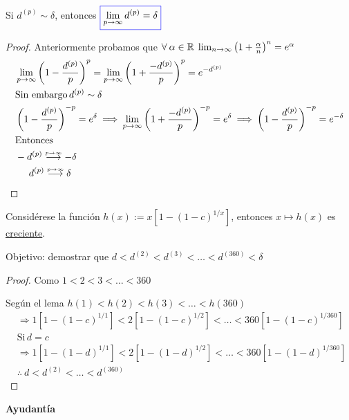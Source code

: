 \begin{proposition}
Si $d^{(p)} \sim \delta$, entonces $\color{blue}\boxed{\color{black} \lim_{p \to \infty} d^{(p)} = \delta }$
\end{proposition}
\begin{proof}
Anteriormente probamos que $\forall \: \alpha \in \mathbb R \; \lim_{n \to \infty} \left(1 + \frac{\alpha}{n} \right)^n = e^{\alpha}$
\begin{align*}
&\lim_{p \to \infty} \left(1 - \frac{d^{(p)}}{p} \right)^p = \lim_{p \to \infty} \left(1 + \frac{-d^{(p)}}{p} \right)^p = e^{-d^{(p)}} \\
&\text{Sin embargo} \, d^{(p)} \sim \delta \\
&\left(1 - \frac{d^{(p)}}{p} \right)^{-p} = e^{\delta} \: \Longrightarrow \: \lim_{p \to \infty} \left(1+ \frac{-d^{(p)}}{p} \right)^{-p} = e^{\delta} \: \Longrightarrow \: \left(1 - \frac{d^{(p)}}{p}\right)^{-p} = e^{-\delta}\\
&\text{Entonces} \\
& - d^{(p)} \mathrel{\stackon[1pt]{$\longrightarrow $}{$\scriptscriptstyle p\rightarrow \infty$}} -\delta \\
& \hspace{0.5cm} d^{(p)} \mathrel{\stackon[1pt]{$\longrightarrow $}{$\scriptscriptstyle p\rightarrow \infty$}} \delta 
\end{align*}
\end{proof}
\begin{lemma}
Considérese la función $\boxed{h(x) := x\left[ 1-(1-c)^{1/x}\right] }$, entonces $x \longmapsto h(x)$  es \uline{creciente}.
\end{lemma}
Objetivo: demostrar que $d<d^{(2)}<d^{(3)}<\ldots<d^{(360)}<\delta$
\begin{proof}
Como $1<2<3<\ldots<360$

Según el lema $h(1)<h(2)<h(3)<\ldots<h(360)$
\begin{align*}
&\Longrightarrow 1\left[ 1-(1-c)^{1/1}\right] < 2\left[ 1-(1-c)^{1/2}\right] < \ldots < 360\left[ 1-(1-c)^{1/360}\right]&\\
&\text{Si} \, d=c &\\
&\Longrightarrow 1\left[ 1-(1-d)^{1/1}\right] < 2\left[ 1-(1-d)^{1/2}\right] < \ldots < 360\left[ 1-(1-d)^{1/360}\right]&\\
&\therefore \: d<d^{(2)}<\ldots<d^{(360)}&
\end{align*}
\end{proof}
\textbf{Ayudantía}

